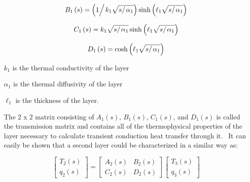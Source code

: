 \begin{equation}
{B_1}\left( s \right) = \left( {{1 \mathord{\left/ {\vphantom {1 {{k_1}\sqrt {{s \mathord{\left/ {\vphantom {s {{\alpha_1}}}} \right. } {{\alpha_1}}}} }}} \right. } {{k_1}\sqrt {{s \mathord{\left/ {\vphantom {s {{\alpha_1}}}} \right. } {{\alpha_1}}}} }}} \right)\sinh \left( {{\ell_1}\sqrt {{s \mathord{\left/ {\vphantom {s {{\alpha_1}}}} \right. } {{\alpha_1}}}} } \right)
\end{equation}

\begin{equation}
{C_1}\left( s \right) = {k_1}\sqrt {{s \mathord{\left/ {\vphantom {s {{\alpha_1}}}} \right. } {{\alpha_1}}}} \sinh \left( {{\ell_1}\sqrt {{s \mathord{\left/ {\vphantom {s {{\alpha_1}}}} \right. } {{\alpha_1}}}} } \right)
\end{equation}

\begin{equation}
{D_1}\left( s \right) = \cosh \left( {{\ell_1}\sqrt {{s \mathord{\left/ {\vphantom {s {{\alpha_1}}}} \right. } {{\alpha_1}}}} } \right)
\end{equation}

\(k_1\) is the thermal conductivity of the layer

\(\alpha_1\) is the thermal diffusivity of the layer

\({\ell_1}\) is the thickness of the layer.

The 2 x 2 matrix consisting of \(A_1(s)\), \(B_1(s)\), \(C_1(s)\), and \(D_1(s)\) is called the transmission matrix and contains all of the thermophysical properties of the layer necessary to calculate transient conduction heat transfer through it.~ It can easily be shown that a second layer could be characterized in a similar way as:

\begin{equation}
\left[ {\begin{array}{*{20}{c}}{{T_2}\left( s \right)}\\ {{q_2}\left( s \right)}\end{array}} \right] = \left[ {\begin{array}{*{20}{c}}{{A_2}\left( s \right)}&{{B_2}\left( s \right)}\\ {{C_2}\left( s \right)}&{{D_2}\left( s \right)}\end{array}} \right]\left[ {\begin{array}{*{20}{c}}{{T_3}\left( s \right)}\\ {{q_3}\left( s \right)}\end{array}} \right]
\end{equation}

